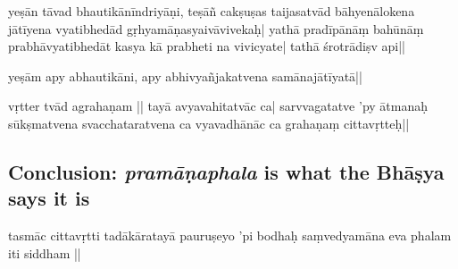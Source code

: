 yeṣān tāvad bhautikānīndriyāṇi, teṣā\mde ñ cakṣuṣas taijasatvād bāhyenālokena jātīyena 
vyatibhedād gṛhyamāṇasyaivāvivekaḥ| yathā pradīpānāṃ bahūnāṃ prabhāvyatibhedāt kasya kā prabheti %
na vivicyate| tathā śrotrādiṣv api||

yeṣām apy abhautikāni, 
apy a\mde bhivyañjakatvena samānajātīyatā||

vṛtter 
%
tvād agrahaṇam 
%
|| %
%
tay\mds ā 
avyavahitatvāc ca| sarvvagatatve ’py ātmanaḥ sūkṣmatvena svacchataratvena ca 
%
vyavadhānāc ca grahaṇaṃ citta\mde vṛtteḥ||

\subsection{Conclusion: \emph{pramāṇaphala} is what the Bhāṣya says it is}
tasmāc cittavṛtti tadākāratay\mds ā pauruṣeyo ’pi bodhaḥ %
saṃvedya\-māna eva phalam iti siddham ||


